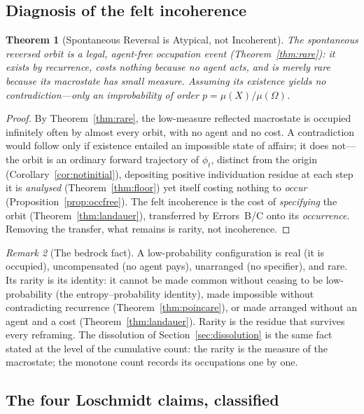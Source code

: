 \documentclass[twocolumn,10pt,a4paper]{article}
\theoremstyle{thmstyle}
\newtheorem{theorem}{Theorem}[section]
\theoremstyle{definition}
\theoremstyle{remark}
\newtheorem{remark}[theorem]{Remark}
\begin{document}
\subsection{Diagnosis of the felt incoherence}

\begin{theorem}[Spontaneous Reversal is Atypical, not Incoherent]
\label{thm:atypical}
The spontaneous reversed orbit is a legal, agent-free occupation
event (Theorem~\ref{thm:rare}): it exists by recurrence, costs
nothing because no agent acts, and is merely rare because its
macrostate has small measure. Assuming its existence yields no
contradiction---only an improbability of order
$p=\mu(X)/\mu(\Omega)$.
\end{theorem}

\begin{proof}
By Theorem~\ref{thm:rare}, the low-measure reflected macrostate is
occupied infinitely often by almost every orbit, with no agent and
no cost. A contradiction would follow only if existence entailed an
impossible state of affairs; it does not---the orbit is an ordinary
forward trajectory of $\phi_{t}$, distinct from the origin
(Corollary~\ref{cor:notinitial}), depositing positive individuation
residue at each step it is \emph{analysed} (Theorem~\ref{thm:floor})
yet itself costing nothing to \emph{occur}
(Proposition~\ref{prop:occfree}). The felt incoherence is the cost
of \emph{specifying} the orbit (Theorem~\ref{thm:landauer}),
transferred by Errors~B/C onto its \emph{occurrence}. Removing the
transfer, what remains is rarity, not incoherence.
\end{proof}

\begin{remark}[The bedrock fact]
\label{rem:bedrock}
A low-probability configuration is real (it is occupied), uncompensated
(no agent pays), unarranged (no specifier), and rare. Its rarity is
its identity: it cannot be made common without ceasing to be
low-probability (the entropy--probability identity), made impossible
without contradicting recurrence (Theorem~\ref{thm:poincare}), or
made arranged without an agent and a cost
(Theorem~\ref{thm:landauer}). Rarity is the residue that survives
every reframing. The dissolution of
Section~\ref{sec:dissolution} is the same fact stated at the level
of the cumulative count: the rarity is the measure of the macrostate;
the monotone count records its occupations one by one.
\end{remark}

\subsection{The four Loschmidt claims, classified}
\end{document}
